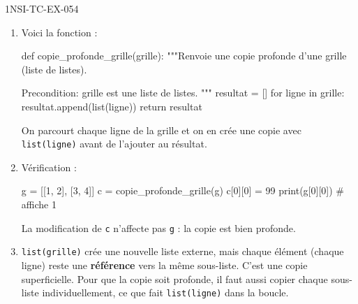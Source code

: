 %
\begin{corrige}{1NSI-TC-EX-054}
\begin{enumerate}
  \item Voici la fonction :
\begin{python}
def copie_profonde_grille(grille):
    """Renvoie une copie profonde d'une grille (liste de listes).

    Precondition: grille est une liste de listes.
    """
    resultat = []
    for ligne in grille:
        resultat.append(list(ligne))
    return resultat
\end{python}
On parcourt chaque ligne de la grille et on en crée une copie avec \lstinline{list(ligne)} avant de l'ajouter au résultat.

  \item Vérification :
\begin{python}
g = [[1, 2], [3, 4]]
c = copie_profonde_grille(g)
c[0][0] = 99
print(g[0][0])  # affiche 1
\end{python}
La modification de \lstinline{c} n'affecte pas \lstinline{g} : la copie est bien profonde.

  \item \lstinline{list(grille)} crée une nouvelle liste externe, mais chaque élément (chaque ligne) reste une \textbf{référence} vers la même sous-liste. C'est une copie superficielle. Pour que la copie soit profonde, il faut aussi copier chaque sous-liste individuellement, ce que fait \lstinline{list(ligne)} dans la boucle.
\end{enumerate}
\end{corrige}
